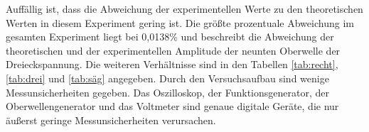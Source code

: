 Auffällig ist, dass die Abweichung der experimentellen Werte zu den theoretischen Werten in diesem Experiment gering ist.
Die größte prozentuale Abweichung im gesamten Experiment liegt bei 0,0138\% und beschreibt die Abweichung der theoretischen und der experimentellen Amplitude der neunten Oberwelle der Dreieckspannung.
Die weiteren Verhältnisse sind in den Tabellen \ref{tab:recht}, \ref{tab:drei} und \ref{tab:säg} angegeben.
Durch den Versuchsaufbau sind wenige Messunsicherheiten gegeben.
Das Oszilloskop, der Funktionsgenerator, der Oberwellengenerator und das Voltmeter sind genaue digitale Geräte, die nur äußerst geringe Messunsicherheiten verursachen.
